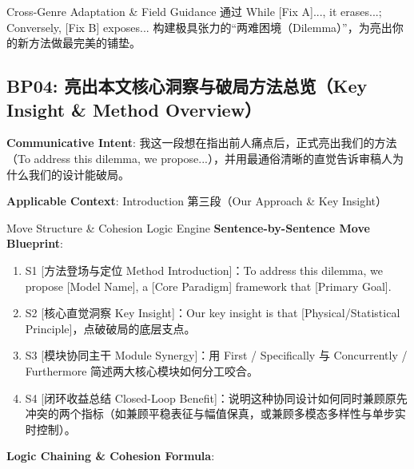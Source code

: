 \endgroup
\vspace{4pt}
\begin{TipBox}{Cross-Genre Adaptation \& Field Guidance}
通过 While [Fix A]..., it erases...; Conversely, [Fix B] exposes... 构建极具张力的“两难困境（Dilemma）”，为亮出你的新方法做最完美的铺垫。
\end{TipBox}
\vspace{8pt}
\subsection{BP04: 亮出本文核心洞察与破局方法总览（Key Insight \& Method Overview）}\label{sec:bp:BP04}
\noindent\textbf{\color{AcadNavy}Communicative Intent}: 我这一段想在指出前人痛点后，正式亮出我们的方法（To address this dilemma, we propose...），并用最通俗清晰的直觉告诉审稿人为什么我们的设计能破局。\par\vspace{2pt}
\noindent\textbf{\color{AcadSlate}Applicable Context}: Introduction 第三段（Our Approach \& Key Insight）\par\vspace{4pt}
\begin{ConceptBox}{Move Structure \& Cohesion Logic Engine}
\textbf{Sentence-by-Sentence Move Blueprint}:
\begin{enumerate}[label=\textbf{\color{AcadNavy}S\arabic*.}, leftmargin=2em, itemsep=2pt]
  \item S1 [方法登场与定位 Method Introduction]：To address this dilemma, we propose [Model Name], a [Core Paradigm] framework that [Primary Goal].
  \item S2 [核心直觉洞察 Key Insight]：Our key insight is that [Physical/Statistical Principle]，点破破局的底层支点。
  \item S3 [模块协同主干 Module Synergy]：用 First / Specifically 与 Concurrently / Furthermore 简述两大核心模块如何分工咬合。
  \item S4 [闭环收益总结 Closed-Loop Benefit]：说明这种协同设计如何同时兼顾原先冲突的两个指标（如兼顾平稳表征与幅值保真，或兼顾多模态多样性与单步实时控制）。
\end{enumerate}\par\vspace{4pt}
\textbf{Logic Chaining \& Cohesion Formula}:\par{}
\end{ConceptBox}
